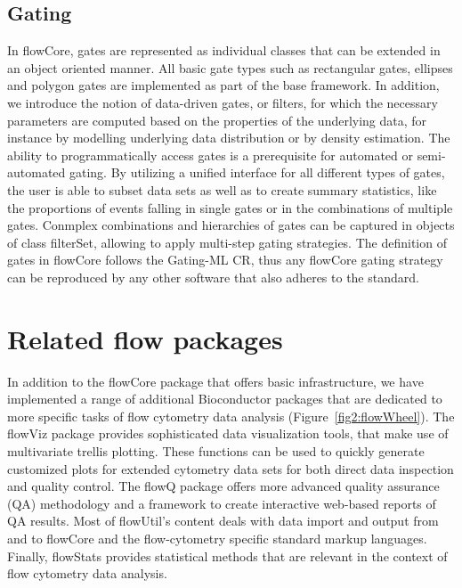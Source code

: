 \documentclass[12pt]{article}
\begin{document}
\subsection*{Gating}
In flowCore, gates are represented as individual classes that can be
extended in an object oriented manner. All basic gate types such as
rectangular gates, ellipses and polygon gates are implemented as part
of the base framework. In addition, we introduce the notion of
data-driven gates, or filters, for which the necessary parameters are
computed based on the properties of the underlying data, for instance
by modelling underlying data distribution or by density
estimation. The ability to programmatically access gates is a
prerequisite for automated or semi-automated gating. By utilizing a
unified interface for all different types of gates, the user is able
to subset data sets as well as to create summary statistics, like the
proportions of events falling in single gates or in the combinations
of multiple gates. Conmplex combinations and hierarchies of gates can
be captured in objects of class filterSet, allowing to apply
multi-step gating strategies. The definition of gates in flowCore
follows the Gating-ML CR, thus any flowCore gating strategy can be
reproduced by any other software that also adheres to the standard.

\section*{Related flow packages}
In addition to the flowCore package that offers basic infrastructure,
we have implemented a range of additional Bioconductor packages that
are dedicated to more specific tasks of flow cytometry data analysis
(Figure~\ref{fig2:flowWheel}). The flowViz package provides
sophisticated data visualization tools, that make use of multivariate
trellis plotting. These functions can be used to quickly generate
customized plots for extended cytometry data sets for both direct data
inspection and quality control. The flowQ package offers more advanced
quality assurance (QA) methodology and a framework to create
interactive web-based reports of QA results. Most of flowUtil's
content deals with data import and output from and to flowCore and the
flow-cytometry specific standard markup languages. Finally, flowStats
provides statistical methods that are relevant in the context of flow
cytometry data analysis.
\end{document}
